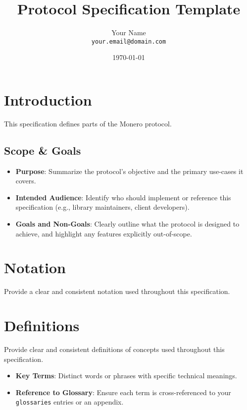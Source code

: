 \documentclass[12pt,a4paper]{article}
\title{\textbf{Protocol Specification Template}}
\author{Your Name \\ \texttt{your.email@domain.com}}
\date{\today}
\begin{document}
\maketitle

\tableofcontents
\clearpage

\section{Introduction}

This specification defines parts of the Monero protocol. 

\subsection{Scope \& Goals}
\begin{itemize}[noitemsep]
  \item \textbf{Purpose}: Summarize the protocol’s objective and the 
  primary use-cases it covers.
  \item \textbf{Intended Audience}: Identify who should implement or 
  reference this specification (e.g., library maintainers, client 
  developers).
  \item \textbf{Goals and Non-Goals}: Clearly outline what the protocol 
  is designed to achieve, and highlight any features explicitly 
  out-of-scope.
\end{itemize}

\section{Notation}
Provide a clear and consistent notation
used throughout this specification.


\section{Definitions}
Provide clear and consistent definitions of concepts used throughout this specification.

\begin{itemize}[noitemsep]
  \item \textbf{Key Terms}: Distinct words or phrases with specific 
  technical meanings. 
  \item \textbf{Reference to Glossary}: Ensure each term is cross-referenced 
  to your \texttt{glossaries} entries or an appendix.
\end{itemize}
\end{document}
